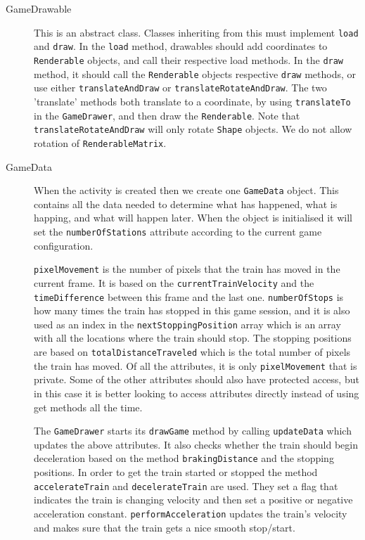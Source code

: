 \begin{description}
\item[GameDrawable] This is an abstract class. Classes inheriting from this must implement \lstinline|load| and \lstinline|draw|. In the \lstinline|load| method, drawables should add coordinates to \lstinline|Renderable| objects, and call their respective load methods. In the \lstinline|draw| method, it should call the \lstinline|Renderable| objects respective \lstinline|draw| methods, or use either \lstinline|translateAndDraw| or \lstinline|translateRotateAndDraw|. The two 'translate' methods both translate to a coordinate, by using \lstinline|translateTo| in the \lstinline|GameDrawer|, and then draw the \lstinline|Renderable|. Note that \lstinline|translateRotateAndDraw| will only rotate \lstinline|Shape| objects. We do not allow rotation of \lstinline|RenderableMatrix|.

\item[GameData] When the activity is created then we create one \lstinline|GameData| object. This contains all the data needed to determine what has happened, what is happing, and what will happen later. When the object is initialised it will set the \lstinline|numberOfStations| attribute according to the current game configuration.

\lstinline|pixelMovement| is the number of pixels that the train has moved in the current frame. It is based on the \lstinline|currentTrainVelocity| and the \lstinline|timeDifference| between this frame and the last one. \lstinline|numberOfStops| is how many times the train has stopped in this game session, and it is also used as an index in the \lstinline|nextStoppingPosition| array which is an array with all the locations where the train should stop. The stopping positions are based on \lstinline|totalDistanceTraveled| which is the total number of pixels the train has moved. Of all the attributes, it is only \lstinline|pixelMovement| that is private. Some of the other attributes should also have protected access, but in this case it is better looking to access attributes directly instead of using get methods all the time.

The \lstinline|GameDrawer| starts its \lstinline|drawGame| method by calling \lstinline|updateData| which updates the above attributes. It also checks whether the train should begin deceleration based on the method \lstinline|brakingDistance| and the stopping positions. In order to get the train started or stopped the method \lstinline|accelerateTrain| and \lstinline|decelerateTrain| are used. They set a flag that indicates the train is changing velocity and then set a positive or negative acceleration constant. \lstinline|performAcceleration| updates the train's velocity and makes sure that the train gets a nice smooth stop/start.


\end{description}
